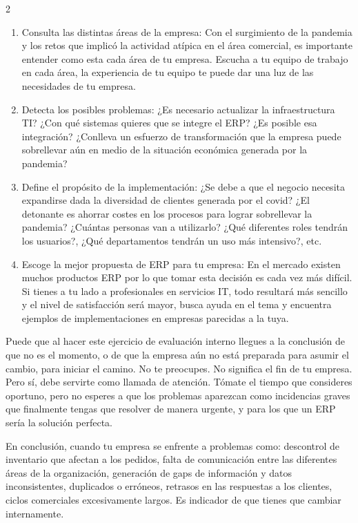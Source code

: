 \documentclass[12pt,spanish,Letterpaper,openany]{book}
\begin{document}
\begin {multicols}{2}
\begin{enumerate}
\def\labelenumi{\arabic{enumi}.}
\item
  Consulta las distintas áreas de la empresa: Con el surgimiento de la pandemia y los
  retos que implicó la actividad atípica en el área comercial, es importante entender
  como esta cada área de tu empresa. Escucha a tu equipo de trabajo en cada área, la
  experiencia de tu equipo te puede dar una luz de las necesidades de tu empresa.
\item
  Detecta los posibles problemas: ¿Es necesario actualizar la infraestructura TI? ¿Con
  qué sistemas quieres que se integre el ERP? ¿Es posible esa integración? ¿Conlleva
  un esfuerzo de transformación que la empresa puede sobrellevar aún en medio de la
  situación económica generada por la pandemia?
\item
  Define el propósito de la implementación: ¿Se debe a que el negocio necesita
  expandirse dada la diversidad de clientes generada por el covid? ¿El detonante es
  ahorrar costes en los procesos para lograr sobrellevar la pandemia? ¿Cuántas personas
  van a utilizarlo? ¿Qué diferentes roles tendrán los usuarios?, ¿Qué departamentos
  tendrán un uso más intensivo?, etc.
\item
  Escoge la mejor propuesta de ERP para tu empresa: En el mercado existen muchos
  productos ERP por lo que tomar esta decisión es cada vez más difícil. Si tienes a tu
  lado a profesionales en servicios IT, todo resultará más sencillo y el nivel de
  satisfacción será mayor, busca ayuda en el tema y encuentra ejemplos de
  implementaciones en empresas parecidas a la tuya.
\end{enumerate}

Puede que al hacer este ejercicio de evaluación interno llegues a la conclusión de que no es el
momento, o de que la empresa aún no está preparada para asumir el cambio, para iniciar el
camino. No te preocupes. No significa el fin de tu empresa. Pero sí, debe servirte como
llamada de atención. Tómate el tiempo que consideres oportuno, pero no esperes a que los
problemas aparezcan como incidencias graves que finalmente tengas que resolver de manera
urgente, y para los que un ERP sería la solución perfecta.

En conclusión, cuando tu empresa se enfrente a problemas como: descontrol de inventario
que afectan a los pedidos, falta de comunicación entre las diferentes áreas de la organización,
generación de gaps de información y datos inconsistentes, duplicados o erróneos, retrasos en
las respuestas a los clientes, ciclos comerciales excesivamente largos. Es indicador de que
tienes que cambiar internamente.


\end{multicols}
\end{document}

